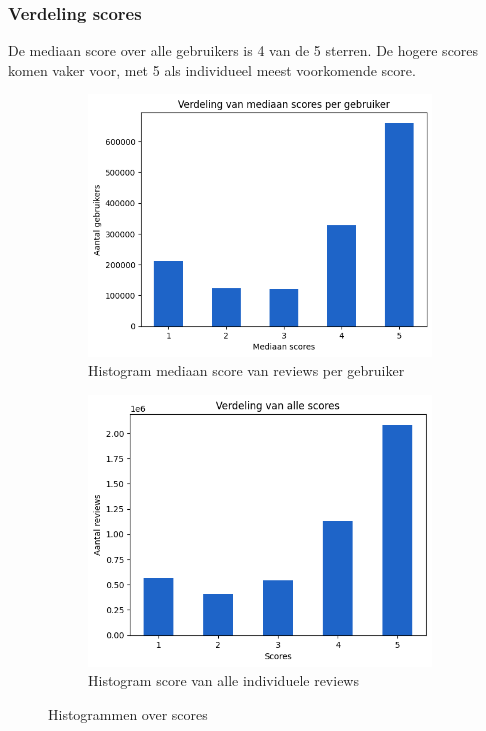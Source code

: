 \subsubsection{Verdeling scores}
De mediaan score over alle gebruikers is 4 van de 5 sterren. De hogere scores komen vaker voor, met 5 als individueel meest voorkomende score.
\begin{figure}[H]
    \begin{subfigure}{.5\textwidth}
        \centering
        \includegraphics[width=1\linewidth]{fig/chapt3/verdeling_mediaan_scores_per_gebruiker.png}
        \caption{Histogram mediaan score van reviews per gebruiker}
        \label{fig:chapt3_verdeling_mediaan_scores_per_gebruiker}
    \end{subfigure}
    \begin{subfigure}{.5\textwidth}
        \centering
        \includegraphics[width=1\linewidth]{fig/chapt3/verdeling_alle_scores.png}
        \caption{Histogram score van alle individuele reviews}
        \label{fig:chapt3_verdeling_alle_scores}
    \end{subfigure}
    \caption{Histogrammen over scores}
\end{figure}
